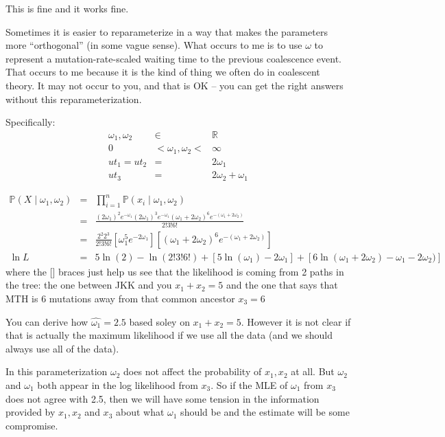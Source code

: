 \documentclass[11pt]{article}
\renewcommand{\Pr}{\mathbb{P}}
\begin{document}
This is fine and it works fine.

Sometimes it is easier to reparameterize in a way that makes the parameters more
``orthogonal'' (in some vague sense).
What occurs to me is to use $\omega$ to represent a mutation-rate-scaled waiting
time to the previous coalescence event.
That occurs to me because it is the kind of thing we often do in coalescent theory.
It may not occur to you, and that is OK -- you can get the right answers without
this reparameterization.

Specifically:
\begin{eqnarray}
    \omega_1, \omega_2 & \in &  \mathbb{R}\\
    0 & < \omega_1, \omega_2 < & \infty\\
     ut_1 = ut_2 & = & 2\omega_1  \\
    ut_3 &= & 2\omega_2 + \omega_1
\end{eqnarray}


\begin{eqnarray}
\Pr(X\mid \omega_1,\omega_2)& = & \prod_{i=1}^{n} \Pr(x_i\mid \omega_1,\omega_2)\\
& = &
 \frac{(2\omega_1)^2e^{-\omega_1}(2\omega_1)^3e^{-\omega_1}\left(\omega_1+2\omega_2\right)^6e^{-(\omega_1+2\omega_2)}}{2!3!6!} \\
& = & \frac{2^2 2^3}{2!3!6!}\left[\omega_1^5e^{-2\omega_1}\right]
\left[\left(\omega_1+2\omega_2\right)^6e^{-(\omega_1+2\omega_2)}\right] \\
\ln L & = & 5\ln(2)-\ln(2!3!6!)+ \left[5 \ln(\omega_1) -2\omega_1\right] +
\left[6\ln\left(\omega_1+2\omega_2\right) -\omega_1- 2\omega_2)\right] 
\end{eqnarray}
where the [] braces just help us see that the likelihood is coming from 2 paths in the tree: the one between JKK and you $x_1+x_2 = 5$ and the one that says that MTH
is 6 mutations away from that common ancestor $x_3 = 6$

You can derive how $\hat{\omega_1}=2.5$ based soley on $x_1+x_2 = 5$.
However it is not clear if that is actually the maximum likelihood
if we use all the data (and we should always use all of the data).

In this parameterization $\omega_2$ does not affect the probability of $x_1, x_2$ at 
all. 
But $\omega_2$ and $\omega_1$ both appear in the log likelihood from $x_3$.
So if the MLE of $\omega_1$ from $x_3$ does not agree with 2.5, then we 
    will have some tension in the information provided by $x_1, x_2$
    and $x_3$ about what $\omega_1$ should be and the estimate will be 
    some compromise.
\end{document}
